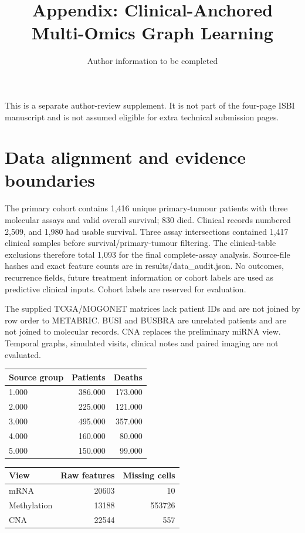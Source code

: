 \documentclass[10pt]{article}
\title{Appendix: Clinical-Anchored Multi-Omics Graph Learning}
\author{Author information to be completed}\date{}
\begin{document}
\pagestyle{empty}\maketitle\thispagestyle{empty}
This is a separate author-review supplement. It is not part of the four-page
ISBI manuscript and is not assumed eligible for extra technical submission pages.
\section{Data alignment and evidence boundaries}
The primary cohort contains 1,416 unique primary-tumour patients with three
molecular assays and valid overall survival; 830 died. Clinical records numbered
2,509, and 1,980 had usable survival. Three assay intersections contained 1,417
clinical samples before survival/primary-tumour filtering. The clinical-table
exclusions therefore total 1,093 for the final complete-assay analysis.
Source-file hashes and exact feature counts are in results/data\_audit.json.
No outcomes, recurrence fields, future treatment information or cohort labels
are used as predictive clinical inputs. Cohort labels are reserved for evaluation.

The supplied TCGA/MOGONET matrices lack patient IDs and are not joined by row
order to METABRIC. BUSI and BUSBRA are unrelated patients and are not joined
to molecular records. CNA replaces the preliminary miRNA view. Temporal
graphs, simulated visits, clinical notes and paired imaging are not evaluated.

\begin{center}
\footnotesize
\begin{tabular}{lrr}\hline
Source group & Patients & Deaths\\\hline
1.000 & 386.000 & 173.000\\
2.000 & 225.000 & 121.000\\
3.000 & 495.000 & 357.000\\
4.000 & 160.000 & 80.000\\
5.000 & 150.000 & 99.000\\
\hline\end{tabular}
\end{center}
\begin{center}
\footnotesize
\begin{tabular}{lrr}\hline
View & Raw features & Missing cells\\\hline
mRNA & 20603 & 10\\
Methylation & 13188 & 553726\\
CNA & 22544 & 557\\
\hline\end{tabular}
\end{center}
\end{document}
